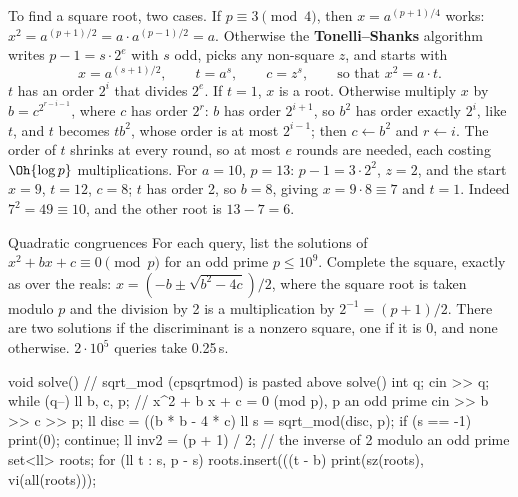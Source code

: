 To find a square root, two cases. If $p \equiv 3 \pmod 4$, then $x = a^{(p+1)/4}$ works: $x^2 = a^{(p+1)/2} = a \cdot a^{(p-1)/2} =
a$. Otherwise the \textbf{Tonelli--Shanks} algorithm writes $p - 1 = s \cdot 2^e$ with $s$ odd, picks any non-square $z$, and starts with
\[
  x = a^{(s+1)/2}, \qquad t = a^s, \qquad c = z^s, \qquad \text{so that } x^2 = a \cdot t .
\]
$t$ has an order $2^i$ that divides $2^e$. If $t = 1$, $x$ is a root. Otherwise multiply $x$ by $b = c^{2^{r - i - 1}}$, where $c$
has order $2^r$: $b$ has order $2^{i+1}$, so $b^2$ has order exactly $2^i$, like $t$, and $t$ becomes $t b^2$, whose order is at most $2^{i-1}$; then $c \gets b^2$ and $r \gets i$. The order of $t$ shrinks at
every round, so at most $e$ rounds are needed, each costing $\Oh{\log p}$ multiplications. For $a = 10$, $p = 13$: $p - 1 = 3 \cdot
2^2$, $z = 2$, and the start $x = 9$, $t = 12$, $c = 8$; $t$ has order 2, so $b = 8$, giving $x = 9 \cdot 8 \equiv 7$ and $t = 1$.
Indeed $7^2 = 49 \equiv 10$, and the other root is $13 - 7 = 6$.


\begin{problem}{Quadratic congruences}
For each query, list the solutions of $x^2 + bx + c \equiv 0 \pmod p$ for an odd prime $p \le 10^9$.
\solution Complete the square, exactly as over the reals: $x = (-b \pm \sqrt{b^2 - 4c})/2$, where the square root is taken modulo $p$
and the division by 2 is a multiplication by $2^{-1} = (p + 1)/2$. There are two solutions if the discriminant is a nonzero square,
one if it is 0, and none otherwise. $2 \cdot 10^5$ queries take 0.25\,s.
\end{problem}

\begin{code}
void solve() {  // sqrt_mod (cpsqrtmod) is pasted above solve()
    int q;
    cin >> q;
    while (q--) {
        ll b, c, p;  // x^2 + b x + c = 0 (mod p), p an odd prime
        cin >> b >> c >> p;
        ll disc = ((b * b - 4 * c) %
        ll s = sqrt_mod(disc, p);
        if (s == -1) {
            print(0);
            continue;
        }
        ll inv2 = (p + 1) / 2;  // the inverse of 2 modulo an odd prime
        set<ll> roots;
        for (ll t : {s, p - s}) roots.insert(((t - b) %
        print(sz(roots), vi(all(roots)));
    }
}
\end{code}

